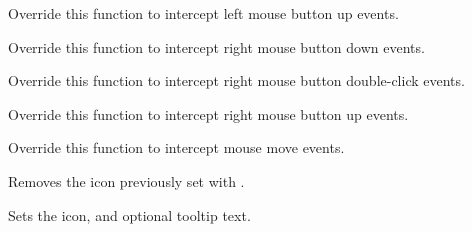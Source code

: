 \label{wxtaskbaricononlbuttonup}


Override this function to intercept left mouse button up events.

\label{wxtaskbaricononrbuttondown}


Override this function to intercept right mouse button down events.

\label{wxtaskbaricononrbuttondclick}


Override this function to intercept right mouse button double-click events.

\label{wxtaskbaricononrbuttonup}


Override this function to intercept right mouse button up events.

\label{wxtaskbaricononmousemove}


Override this function to intercept mouse move events.

\label{wxtaskbariconremoveicon}


Removes the icon previously set with .

\label{wxtaskbariconseticon}


Sets the icon, and optional tooltip text.


